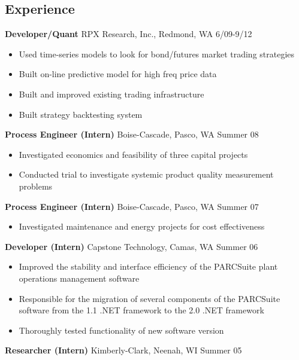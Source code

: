 \documentclass[margin]{res}
\newcommand{\bactivity}[3]{
  {\bf #1} #2 \hfill #3
    \vspace{6pt}
    \begin{itemize} \itemsep -2pt
      }
\newcommand{\eactivity}[0]{\end{itemize}}
\begin{document}
 
 
\begin{resume} 
 

\section{Experience}
  \bactivity{Developer/Quant}{RPX Research, Inc., Redmond, WA}{6/09-9/12}
     \item Used time-series models to look for bond/futures market trading strategies 
     \item Built on-line predictive model for high freq price data 
     \item Built and improved existing trading infrastructure
     \item Built strategy backtesting system
  \eactivity

  \bactivity{Process Engineer (Intern)}{Boise-Cascade, Pasco, WA}{Summer 08}
    \item Investigated economics and feasibility of three capital projects 
    \item Conducted trial to investigate systemic product quality measurement problems 
  \eactivity

  \bactivity{Process Engineer (Intern)}{Boise-Cascade, Pasco, WA}{Summer 07}
    \item Investigated maintenance and energy projects for cost effectiveness 
  \eactivity

  \bactivity{Developer (Intern)}{Capstone Technology, Camas, WA}{Summer 06}
    \item Improved the stability and interface efficiency of the PARCSuite plant operations management software 
    \item Responsible for the migration of several components of the PARCSuite software from the 1.1 .NET framework to the 2.0 .NET framework 
    \item Thoroughly tested functionality of new software version 
  \eactivity

  {\bf Researcher (Intern)} Kimberly-Clark, Neenah, WI \hfill  Summer 05


\end{resume}
\end{document}
